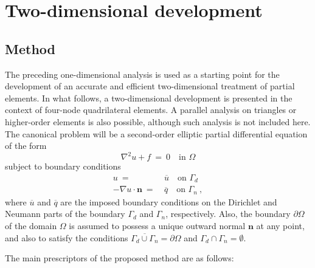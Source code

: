 \documentclass[12pt,twoside]{article}
\newcommand{\bn}{\mathbf{n}}
\begin{document}
\section{Two-dimensional development}\label{sec:twod}
\par
\subsection{Method}\label{sec:methods2d}
\par
The preceding one-dimensional analysis is used as a starting point for
the development of an accurate and efficient two-dimensional treatment
of partial elements. In what follows, a two-dimensional development
is presented in the context of four-node quadrilateral elements. A
parallel analysis on triangles or higher-order elements is also
possible, although such analysis is not included here. The
canonical problem will be a second-order elliptic partial differential
equation of the form 
%
\begin{equation}\label{eq:2dpde}
\nabla^2 u + f\ =\ 0\quad\text{in }\Omega
\end{equation}
%
subject to boundary conditions
%
\begin{align}\label{eq:2dbc}
u\ =\ & \overline{u}\quad\text{on }\Gamma_d \\
-\nabla u \cdot \bn\ =\ & \overline{q}\quad\text{on }\Gamma_n\ ,
\end{align}
%
where $\overline{u}$ and $\overline{q}$ are the imposed boundary
conditions on the Dirichlet and Neumann parts of the boundary
$\Gamma_d$ and $\Gamma_n$, respectively. Also, the boundary
$\partial\Omega$ of the domain $\Omega$ is assumed to possess a unique
outward normal $\bn$ at any point, and also to satisfy the conditions 
$\overline{\Gamma_d\cup\Gamma_n} = \partial\Omega$ and 
$\Gamma_d\cap\Gamma_n = \emptyset$. 
\par
The main prescriptors of the proposed method are as follows: 
\end{document}
